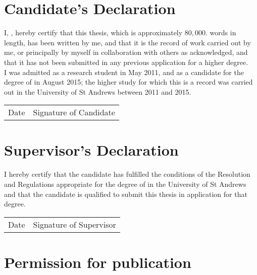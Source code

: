 \begin{declaration}
\section*{Candidate's Declaration}

I, \theauthor, hereby certify that this thesis, which is approximately $80,000$. words in length, has been written by me, and that it is the record of work carried out by me, or principally by myself in collaboration with others as acknowledged, and that it has not been submitted in any previous application for a higher degree.\\

\noindent
I was admitted as a research student in May 2011, and as a candidate for the degree of \thedegree in August 2015; the higher study for which this is a record was carried out in the University of St Andrews between 2011 and 2015.
\\

\vspace{3em}

\begin{tabularx}{0.9\textwidth}{p{}X}
Date\xspace\dotfill& Signature of Candidate\xspace\dotfill\\
\end{tabularx}

\section*{Supervisor's Declaration}

I hereby certify that the candidate has fulfilled the conditions of the Resolution and Regulations appropriate for the degree of \thedegree in the University of St Andrews and that the candidate is qualified to submit this thesis in application for that degree.

\vspace{3em}

\begin{tabularx}{0.9\textwidth}{p{}X}
Date\xspace\dotfill & Signature of Supervisor\xspace\dotfill\\
\end{tabularx}

\section*{Permission for publication}


\end{declaration}
